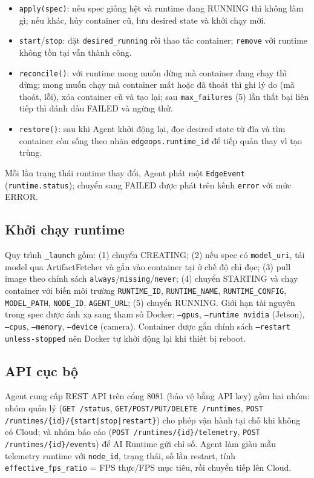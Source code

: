 \begin{itemize}
  \item \texttt{apply(spec)}: nếu spec giống hệt và runtime đang RUNNING thì không
        làm gì; nếu khác, hủy container cũ, lưu desired state và khởi chạy mới.
  \item \texttt{start}/\texttt{stop}: đặt \texttt{desired\_running} rồi thao tác
        container; \texttt{remove} với runtime không tồn tại vẫn thành công.
  \item \texttt{reconcile()}: với runtime mong muốn dừng mà container đang chạy thì
        dừng; mong muốn chạy mà container mất hoặc đã thoát thì ghi lý do (mã thoát,
        lỗi), xóa container cũ và tạo lại; sau \texttt{max\_failures} (5) lần thất bại
        liên tiếp thì đánh dấu FAILED và ngừng thử.
  \item \texttt{restore()}: sau khi Agent khởi động lại, đọc desired state từ đĩa và
        tìm container còn sống theo nhãn \texttt{edgeops.runtime\_id} để tiếp quản
        thay vì tạo trùng.
\end{itemize}

Mỗi lần trạng thái runtime thay đổi, Agent phát một \texttt{EdgeEvent}
(\texttt{runtime.status}); chuyển sang FAILED được phát trên kênh \texttt{error}
với mức ERROR.

\subsection{Khởi chạy runtime}

Quy trình \texttt{\_launch} gồm: (1) chuyển CREATING; (2) nếu spec có
\texttt{model\_uri}, tải model qua ArtifactFetcher và gắn vào container tại
 ở chế độ chỉ đọc; (3) pull image theo chính sách
\texttt{always}/\texttt{missing}/\texttt{never}; (4) chuyển STARTING và chạy
container với biến môi trường \texttt{RUNTIME\_ID}, \texttt{RUNTIME\_NAME},
\texttt{RUNTIME\_CONFIG}, \texttt{MODEL\_PATH}, \texttt{NODE\_ID},
\texttt{AGENT\_URL}; (5) chuyển RUNNING. Giới hạn tài nguyên trong spec được ánh
xạ sang tham số Docker: \texttt{--gpus}, \texttt{--runtime nvidia} (Jetson),
\texttt{--cpus}, \texttt{--memory}, \texttt{--device} (camera). Container được gắn
chính sách \texttt{--restart unless-stopped} nên Docker tự khởi động lại khi
thiết bị reboot.

\subsection{API cục bộ}

Agent cung cấp REST API trên cổng 8081 (bảo vệ bằng API key) gồm hai nhóm:
nhóm quản lý (\texttt{GET /status}, \texttt{GET/POST/PUT/DELETE /runtimes},
\texttt{POST /runtimes/\{id\}/\{start|stop|restart\}}) cho phép vận hành tại chỗ
khi không có Cloud; và nhóm báo cáo (\texttt{POST /runtimes/\{id\}/telemetry},
\texttt{POST /runtimes/\{id\}/events}) để AI Runtime gửi chỉ số. Agent làm giàu mẫu
telemetry runtime với \texttt{node\_id}, trạng thái, số lần restart, tính
\texttt{effective\_fps\_ratio} = FPS thực/FPS mục tiêu, rồi chuyển tiếp lên Cloud.
